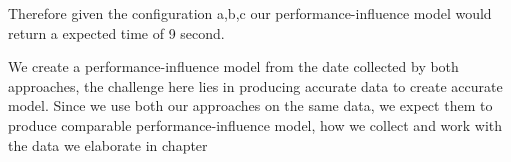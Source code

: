 Therefore given the configuration a,b,c our performance-influence model would return a expected time of 9 second.

We create a performance-influence model from the date collected by both approaches, the challenge here lies in producing accurate data
to create accurate model. Since we use both our approaches on the same data, we expect them to produce comparable performance-influence model,
how we collect and work with the data we elaborate in chapter %